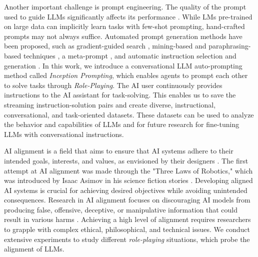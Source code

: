 Another important challenge is prompt engineering. The quality of the prompt used to guide LLMs significantly affects its performance \cite{radford2019language,brown2020language,li2021prefix}. While LMs pre-trained on large data can implicitly learn tasks with few-shot prompting, hand-crafted prompts may not always suffice. Automated prompt generation methods have been proposed, such as gradient-guided search \cite{shin2020autoprompt}, mining-based and paraphrasing-based techniques \cite{jiang2020can}, a meta-prompt \cite{reynolds2021prompt}, and automatic instruction selection and generation \cite{zhou2023large}. In this work, we introduce a conversational LLM auto-prompting method called \textit{Inception Prompting}, which enables agents to prompt each other to solve tasks through \textit{Role-Playing}. The AI user continuously provides instructions to the AI assistant for task-solving. This enables us to save the streaming instruction-solution pairs and create diverse, instructional, conversational, and task-oriented datasets. These datasets can be used to analyze the behavior and capabilities of LLMs and for future research for fine-tuning LLMs with conversational instructions.

 AI alignment is a field that aims to ensure that AI systems adhere to their intended goals, interests, and values, as envisioned by their designers \cite{andreas2015alignment,hadfield2019legible,Stray2020AligningAO,Gabriel2020ArtificialIV,hadfield2021principal,Matthews2022TheAP,bai2022constitutional}. The first attempt at AI alignment was made through the "Three Laws of Robotics," which was introduced by Isaac Asimov in his science fiction stories \cite{asimov1940robot}. Developing aligned AI systems is crucial for achieving desired objectives while avoiding unintended consequences. Research in AI alignment focuses on discouraging AI models from producing false, offensive, deceptive, or manipulative information that could result in various harms \cite{kenton2021alignment,tamkin2021understanding,henderson2018ethical,goldstein2023generative}. Achieving a high level of alignment requires researchers to grapple with complex ethical, philosophical, and technical issues.
We conduct extensive experiments to study different \textit{role-playing} situations, which probe the alignment of LLMs.

